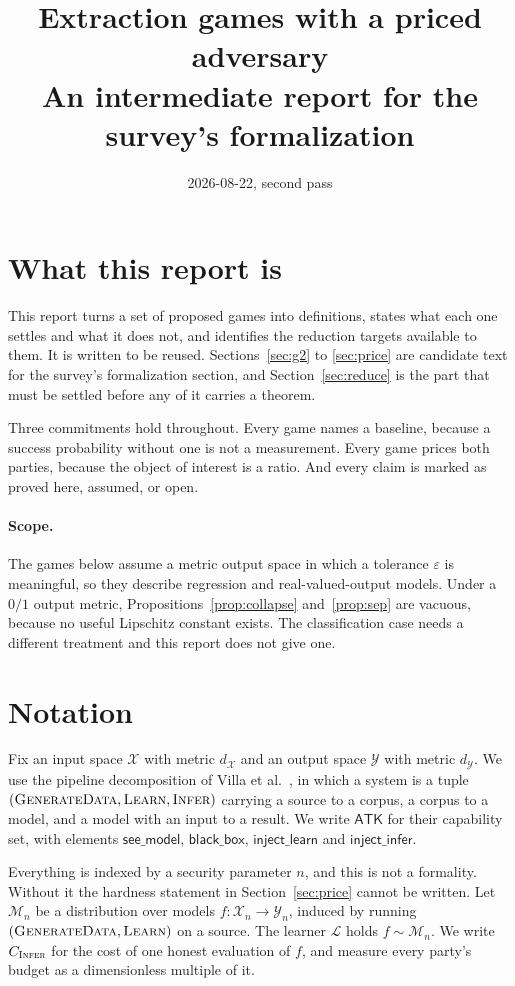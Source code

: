 \documentclass[11pt]{article}
\title{Extraction games with a priced adversary\\
\large An intermediate report for the survey's formalization}
\author{}
\date{2026-08-22, second pass}
\theoremstyle{definition}
\theoremstyle{plain}
\newcommand{\Lrn}{\mathcal{L}}
\newcommand{\X}{\mathcal{X}}
\newcommand{\Y}{\mathcal{Y}}
\newcommand{\M}{\mathcal{M}}
\newcommand{\INFER}{\textsc{Infer}}
\newcommand{\LEARN}{\textsc{Learn}}
\newcommand{\GEN}{\textsc{GenerateData}}
\begin{document}
\maketitle

\section{What this report is}

This report turns a set of proposed games into definitions, states what each one
settles and what it does not, and identifies the reduction targets available to
them. It is written to be reused. Sections~\ref{sec:g2} to \ref{sec:price} are
candidate text for the survey's formalization section, and
Section~\ref{sec:reduce} is the part that must be settled before any of it carries
a theorem.

Three commitments hold throughout. Every game names a baseline, because a success
probability without one is not a measurement. Every game prices both parties,
because the object of interest is a ratio. And every claim is marked as proved
here, assumed, or open.

\paragraph{Scope.} The games below assume a metric output space in which a
tolerance $\varepsilon$ is meaningful, so they describe regression and
real-valued-output models. Under a $0/1$ output metric, Propositions~\ref{prop:collapse}
and~\ref{prop:sep} are vacuous, because no useful Lipschitz constant exists. The
classification case needs a different treatment and this report does not give one.

\section{Notation}
\label{sec:notation}

Fix an input space $\X$ with metric $d_\X$ and an output space $\Y$ with metric
$d_\Y$. We use the pipeline decomposition of Villa et al.~\cite{VDKMR26}, in which
a system is a tuple $(\GEN, \LEARN, \INFER)$ carrying a source to a corpus, a
corpus to a model, and a model with an input to a result. We write $\mathsf{ATK}$
for their capability set, with elements $\mathsf{see\_model}$,
$\mathsf{black\_box}$, $\mathsf{inject\_learn}$ and $\mathsf{inject\_infer}$.

Everything is indexed by a security parameter $n$, and this is not a formality.
Without it the hardness statement in Section~\ref{sec:price} cannot be written.
Let $\M_n$ be a distribution over models $f : \X_n \to \Y_n$, induced by running
$(\GEN, \LEARN)$ on a source. The learner $\Lrn$ holds $f \sim \M_n$. We write
$C_{\INFER}$ for the cost of one honest evaluation of $f$, and measure every
party's budget as a dimensionless multiple of it.
\end{document}
